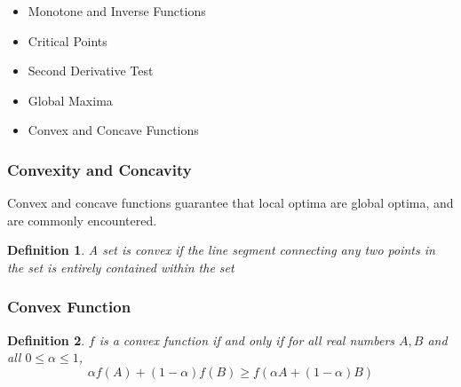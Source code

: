 \documentclass{beamer}
\newtheorem{defn}{Definition}
\numberwithin{equation}{section}
\begin{document}
\begin{frame}

\begin{itemize}
\item \textcolor{mygray}{Monotone and Inverse Functions}
\item \textcolor{mygray}{Critical Points}
\item \textcolor{mygray}{Second Derivative Test}
\item \textcolor{mygray}{Global Maxima}
\item \textcolor{myblack}{Convex and Concave Functions}
\end{itemize}

\end{frame}



\begin{frame}
\frametitle{Convexity and Concavity}

Convex and concave functions guarantee that local optima are global optima, and are commonly encountered. \pause
 
\begin{defn}
A set is \textit{convex} if the line segment connecting any two points in the set is entirely contained within the set
\end{defn}

\begin{center}
\end{center}

\end{frame}



\begin{frame}
\frametitle{Convex Function}

\begin{defn}
$f$ is a convex function if and only if for all real numbers $A, B$ and all $0\leq \alpha \leq 1$, 
$$\alpha f(A)+(1-\alpha)f(B)\geq f(\alpha A+(1-\alpha)B)$$
\end{defn}

\begin{center}
\end{center}

\end{frame}
\end{document}
